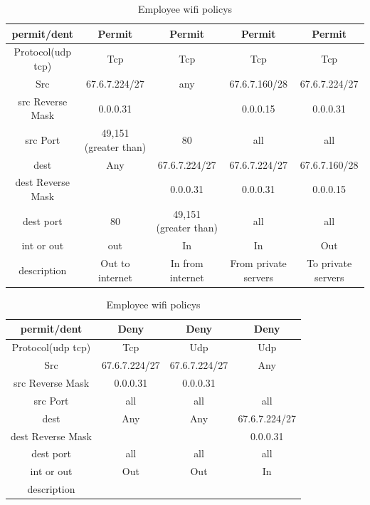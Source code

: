 \documentclass[11pt]{article}
\begin{document}
\begin{table}[!hbt]
	\begin{tabular}{|c|c|c|c|c|}
	\hline		
		permit/dent		 &Permit	&Permit	&Permit&Permit\\ 
	\hline
		Protocol(udp tcp)	&Tcp	&Tcp	&Tcp&Tcp\\
	\hline
		Src			&67.6.7.224/27	&any	&67.6.7.160/28&67.6.7.224/27\\
	\hline
		src Reverse Mask	&0.0.0.31	&&0.0.0.15&0.0.0.31\\
	\hline
		src Port		&49,151 (greater than)	&80	&all&all\\	
	\hline
		dest			&Any	&67.6.7.224/27	&67.6.7.224/27&67.6.7.160/28\\
	\hline
		dest Reverse Mask	&	&0.0.0.31	&0.0.0.31&0.0.0.15\\
	\hline
		dest port		&80	&49,151 (greater than)	&all&all\\
	\hline
		int or out		&out	&In	&In	&Out\\
	\hline
		description		&Out to internet	&In from internet	&From private servers	&To private servers 	\\
	\hline
	\hline	
	\end{tabular}
	\begin{tabular}{|c|c|c|c|}
	\hline		
		permit/dent		 &Deny&Deny&Deny\\ 
	\hline
		Protocol(udp tcp)	&Tcp&Udp&Udp\\
	\hline
		Src			&67.6.7.224/27&67.6.7.224/27&Any\\
	\hline
		src Reverse Mask	&0.0.0.31&0.0.0.31&\\
	\hline
		src Port		&all&all	&all\\	
	\hline
		dest			&Any&Any&67.6.7.224/27\\
	\hline
		dest Reverse Mask	&&	&0.0.0.31\\
	\hline
		dest port		&all&all&all\\
	\hline
		int or out		&Out	&Out	&In\\	
	\hline
		description		&&&\\
	\hline
	\end{tabular}
	\caption{Employee wifi policys}
\end{table}
\end{document}
